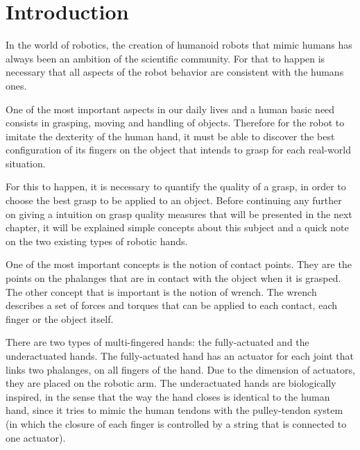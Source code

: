 
\chapter{Introduction}
\label{chapter:introduction}





In the world of robotics, the creation of humanoid robots that mimic humans has always been an ambition of the scientific community. For that to happen is necessary that all aspects of the robot behavior are consistent with the humans ones.
\par
One of the most important aspects in our daily lives and a human basic need consists in grasping, moving and handling of objects. Therefore  for the robot to imitate the dexterity of the human hand, it must be able to discover the best configuration of its fingers on the object that intends to grasp for each real-world situation.
\par
For this to happen, it is necessary to quantify the quality of a grasp, in order to choose the best grasp to be applied to an object. Before continuing any further on giving a intuition on grasp quality measures that will be presented in the next chapter, it will be explained simple concepts about this subject and a quick note on the two existing types of robotic hands.
\par
One of the most important concepts is the notion of contact points. They are the points on the phalanges that are in contact with the object when it is grasped. The other concept that is important is the notion of wrench. The wrench describes a set of forces and torques that can be applied to each contact, each finger or the object itself. 
\par
There are two types of multi-fingered hands: the fully-actuated and the underactuated hands. The fully-actuated hand has an actuator for each joint that links two phalanges, on all fingers of the hand. Due to the dimension of actuators, they are placed on the robotic arm. The underactuated hands are biologically inspired, in the sense that the way the hand closes is identical to the human hand, since it tries to mimic the human tendons with the pulley-tendon system (in which the closure of each finger is controlled by a string that is connected to one actuator).
